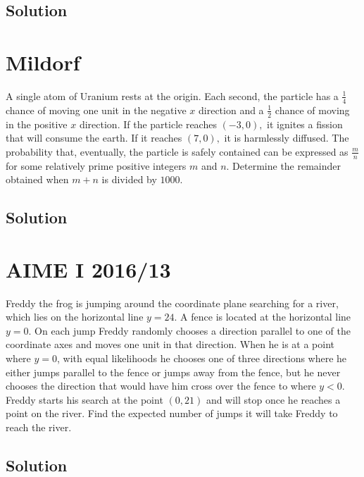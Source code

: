 \documentclass{article}
\begin{document}
\subsection{Solution}





\pagebreak\section{Mildorf} A single atom of Uranium rests at the origin. Each second, the particle has a $\frac{1}{4}$ chance of moving one unit in the negative $x$ direction and a $\frac{1}{2}$ chance of moving in the positive $x$ direction. If the particle reaches $(-3,0),$ it ignites a fission that will consume the earth. If it reaches $(7,0),$ it is harmlessly diffused. The probability that, eventually, the particle is safely contained can be expressed as $\frac{m}{n}$ for some relatively prime positive integers $m$ and $n.$ Determine the remainder obtained when $m+n$ is divided by $1000.$
\subsection{Solution}





\pagebreak\section{AIME I 2016/13} Freddy the frog is jumping around the coordinate plane searching for a river, which lies on the horizontal line $y = 24$. A fence is located at the horizontal line $y = 0$. On each jump Freddy randomly chooses a direction parallel to one of the coordinate axes and moves one unit in that direction. When he is at a point where $y=0$, with equal likelihoods he chooses one of three directions where he either jumps parallel to the fence or jumps away from the fence, but he never chooses the direction that would have him cross over the fence to where $y < 0$. Freddy starts his search at the point $(0, 21)$ and will stop once he reaches a point on the river. Find the expected number of jumps it will take Freddy to reach the river.
\subsection{Solution}
\end{document}
